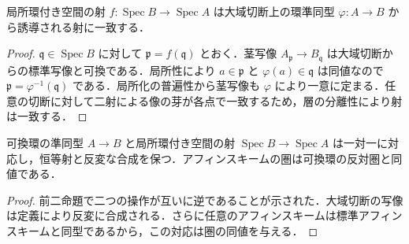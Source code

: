 \begin{prop}[アフィンスキームの射の一意性]
局所環付き空間の射 $f:\operatorname{Spec}B\to\operatorname{Spec}A$ は大域切断上の環準同型 $\varphi:A\to B$ から誘導される射に一致する．
\end{prop}
\begin{proof}
$\mathfrak q\in\operatorname{Spec}B$ に対して $\mathfrak p=f(\mathfrak q)$ とおく．茎写像 $A_{\mathfrak p}\to B_{\mathfrak q}$ は大域切断からの標準写像と可換である．局所性により $a\in\mathfrak p$ と $\varphi(a)\in\mathfrak q$ は同値なので $\mathfrak p=\varphi^{-1}(\mathfrak q)$ である．局所化の普遍性から茎写像も $\varphi$ により一意に定まる．任意の切断に対して二射による像の芽が各点で一致するため，層の分離性により射は一致する．
\end{proof}
\begin{prop}[アフィンスキームと可換環の反変対応]
可換環の準同型 $A\to B$ と局所環付き空間の射 $\operatorname{Spec}B\to\operatorname{Spec}A$ は一対一に対応し，恒等射と反変な合成を保つ．アフィンスキームの圏は可換環の反対圏と同値である．
\end{prop}
\begin{proof}
前二命題で二つの操作が互いに逆であることが示された．大域切断の写像は定義により反変に合成される．さらに任意のアフィンスキームは標準アフィンスキームと同型であるから，この対応は圏の同値を与える．
\end{proof}

